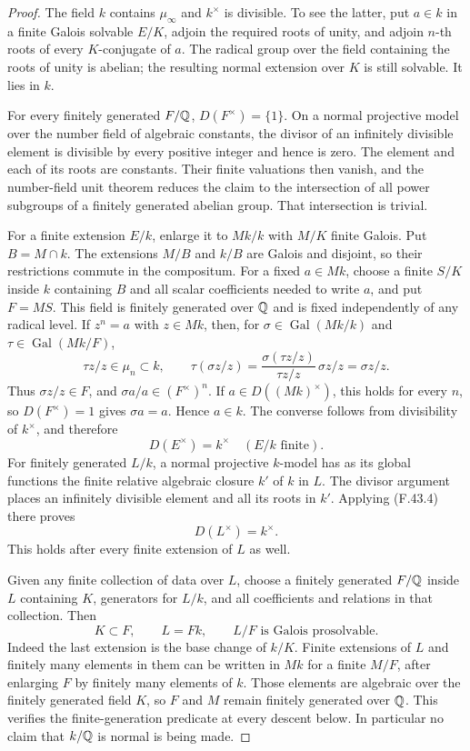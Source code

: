 \begin{proof}
The field $k$ contains $\mu_\infty$ and $k^\times$ is
divisible. To see the latter, put $a\in k$ in a finite
Galois solvable $E/K$, adjoin the required roots of unity,
and adjoin $n$-th roots of every $K$-conjugate of $a$.
The radical group over the field containing the roots
of unity is abelian; the resulting normal extension
over $K$ is still solvable. It lies in $k$.

For every finitely generated $F/\mathbb Q$,
$D(F^\times)=\{1\}$. On a normal projective model over
the number field of algebraic constants, the divisor
of an infinitely divisible element is divisible by
every positive integer and hence is zero. The element
and each of its roots are constants. Their finite
valuations then vanish, and the number-field unit
theorem reduces the claim to the intersection of all
power subgroups of a finitely generated abelian group.
That intersection is trivial.

For a finite extension $E/k$, enlarge it to $Mk/k$ with
$M/K$ finite Galois. Put $B=M\cap k$. The extensions
$M/B$ and $k/B$ are Galois and disjoint, so their
restrictions commute in the compositum. For a fixed
$a\in Mk$, choose a finite $S/K$ inside $k$ containing
$B$ and all scalar coefficients needed to write $a$,
and put $F=MS$. This field is finitely generated over
$\mathbb Q$ and is fixed independently of any radical level.
If $z^n=a$ with $z\in Mk$, then, for
$\sigma\in\operatorname{Gal}(Mk/k)$ and
$\tau\in\operatorname{Gal}(Mk/F)$,
\[
 \tau z/z\in\mu_n\subset k,\qquad
 \tau(\sigma z/z)
   =\frac{\sigma(\tau z/z)}{\tau z/z}\,\sigma z/z
   =\sigma z/z.
\]
Thus $\sigma z/z\in F$, and
$\sigma a/a\in(F^\times)^n$. If $a\in D((Mk)^\times)$,
this holds for every $n$, so $D(F^\times)=1$ gives
$\sigma a=a$. Hence $a\in k$. The converse follows
from divisibility of $k^\times$, and therefore
\[
                   D(E^\times)=k^\times
                   \quad(E/k\text{ finite}).                \tag{F.43.4}
\]
For finitely generated $L/k$, a normal projective
$k$-model has as its global functions the finite
relative algebraic closure $k'$ of $k$ in $L$.
The divisor argument places an infinitely divisible
element and all its roots in $k'$. Applying (F.43.4)
there proves
\[
                  D(L^\times)=k^\times.                    \tag{F.43.5}
\]
This holds after every finite extension of $L$ as well.

Given any finite collection of data over $L$, choose
a finitely generated $F/\mathbb Q$ inside $L$ containing
$K$, generators for $L/k$, and all coefficients and
relations in that collection. Then
\[
                  K\subset F,\qquad L=Fk,
       \qquad L/F\text{ is Galois prosolvable}.              \tag{F.43.6}
\]
Indeed the last extension is the base change of $k/K$.
Finite extensions of $L$ and finitely many elements
in them can be written in $Mk$ for a finite $M/F$,
after enlarging $F$ by finitely many elements of $k$.
Those elements are algebraic over the finitely generated
field $K$, so $F$ and $M$ remain finitely generated
over $\mathbb Q$. This verifies the finite-generation
predicate at every descent below. In particular no
claim that $k/\mathbb Q$ is normal is being made.


\end{proof}
